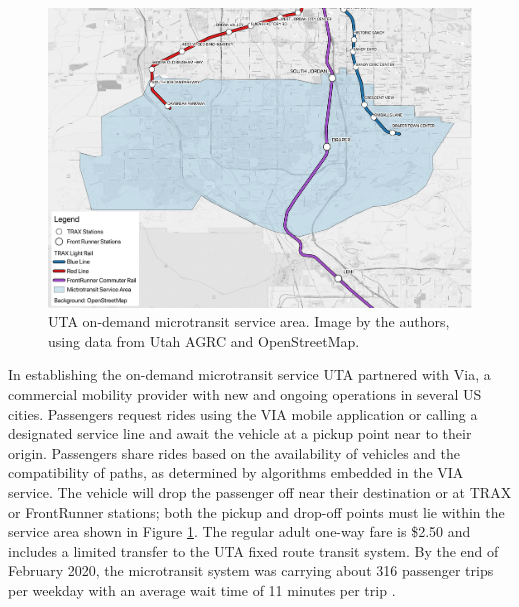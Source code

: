 \documentclass[smartcities,article,submit,moreauthors,pdftex]{Definitions/mdpi}
\begin{document}
\begin{figure}
    \centering
    \includegraphics[width = \textwidth]{service_area.pdf}
    \caption{UTA on-demand microtransit service area. Image by the authors, using data from Utah AGRC and OpenStreetMap.}
    \label{fig:via-map}
\end{figure}

In establishing the on-demand microtransit service UTA partnered with Via, a commercial mobility provider with new and ongoing operations in several US cities. Passengers request rides using the VIA mobile application or calling a designated service line and await the vehicle at a pickup point near to their origin. Passengers share rides based on the availability of vehicles and the compatibility of paths, as determined by algorithms embedded in the VIA service. The vehicle will drop the passenger off near their destination or at TRAX or FrontRunner stations; both the pickup and drop-off points must lie within the service area shown in Figure \ref{fig:via-map}. The regular adult one-way fare is \$2.50 and includes a limited transfer to the UTA fixed route transit system. By the end of February 2020, the microtransit system was carrying about 316 passenger trips per weekday with an average wait time of 11 minutes per trip \citep{uta2020}.
\end{document}
